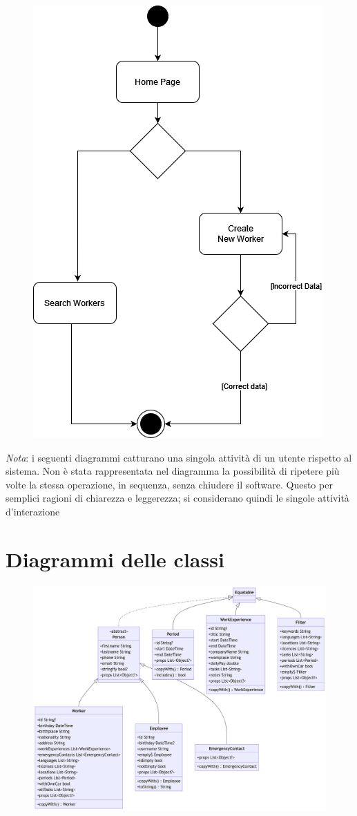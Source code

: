 \documentclass[a4paper, oneside, 12pt]{article}
\begin{document}
\begin{figure}[H]
	\centering
	\includegraphics[width = 10 cm]{images/attivitadipendenti.png}
	\label{fig:attività dipendenti}
\end{figure}

\textit{Nota}: i seguenti diagrammi catturano una singola attività di un utente rispetto al sistema. Non è stata rappresentata nel diagramma la possibilità di ripetere più volte la stessa operazione, in sequenza, senza chiudere il software. Questo per semplici ragioni di chiarezza e leggerezza; si considerano quindi le singole attività d'interazione

\section{Diagrammi delle classi}

\begin{figure}[H]
	\centering
	\includegraphics[width = 10 cm]{images/uml_1.png}
	\label{fig:attività dipendenti}
\end{figure}
\end{document}
